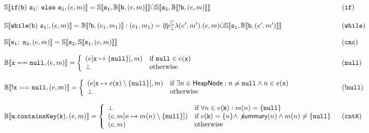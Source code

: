 \begin{figure*}
\[\begin{array}{ll}
\mathbb{S}\llbracket \mathtt{if(b)\ s_1;\ else\ s_2}, (e, m) \rrbracket =  \mathbb{S}\llbracket \mathtt{s_1}, \mathbb{B}\llbracket \mathtt{b}, (e, m) \rrbracket \rrbracket \dot{\cup} \mathbb{S}\llbracket \mathtt{s_2}, \mathbb{B}\llbracket \mathtt{! b}, (e, m) \rrbracket \rrbracket & \mathtt{(if)}\\
\\
\mathbb{S}\llbracket \mathtt{while(b)\ s_1;}, (e, m) \rrbracket = \mathbb{B}\llbracket \mathtt{! b}, (e_1, m_1) \rrbracket : 
(e_1, m_1) = \mathit{lfp}^{\dot{\subseteq}}_{\bot} \lambda (e', m') . (e, m) \dot{\cup} \mathbb{S}\llbracket \mathtt{s_1}, \mathbb{B}\llbracket \mathtt{b}, (e', m') \rrbracket \rrbracket& \mathtt{(while)}\\
\\
\mathbb{S}\llbracket \mathtt{s_1;\ s_2}, (e, m) \rrbracket =  \mathbb{S}\llbracket \mathtt{s_2}, \mathbb{S}\llbracket \mathtt{s_1}, (e, m) \rrbracket \rrbracket & \mathtt{(cnc)}\\
\\
\mathbb{B}\llbracket \mathtt{x==null}, (e, m) \rrbracket = \left\{
\begin{array}{ll}
(e[\mathtt{x} \mapsto \{\mathtt{null}\}], m) & \textrm{if } \mathtt{null} \in e(\mathtt{x})\\
\bot & \textrm{otherwise}\\
\end{array}
\right. & (\mathtt{null})\\
\\
\mathbb{B}\llbracket \mathtt{!x==null}, (e, m) \rrbracket = \left\{
\begin{array}{ll}
(e[\mathtt{x} \mapsto e(\mathtt{x}) \setminus \{\mathtt{null}\}], m) & \textrm{if } \exists n \in \mathsf{HeapNode} : n \neq \mathtt{null} \land n \in e(\mathtt{x})\\
\bot & \textrm{otherwise}\\
\end{array}
\right. & (\mathtt{!null})\\
\\
\mathbb{B}\llbracket \mathtt{m.containsKey(k)}, (e, m) \rrbracket = \left\{
\begin{array}{ll}
\bot & \textrm{if } \forall n \in e(\mathtt{k}) : m(n)=\{\mathtt{null}\}\\
(e, m[n \mapsto m(n)\setminus\{\mathtt{null}\}]) & \textrm{if } e(\mathtt{k}) = \{n\} \land \not \mathsf{summary}(n) \land m(n) \neq \{\mathtt{null}\}\\
(e, m) & \textrm{otherwise}\\
\end{array}
\right. & (\mathtt{cntK})\\
\\

\end{array}\]
\end{figure*}
